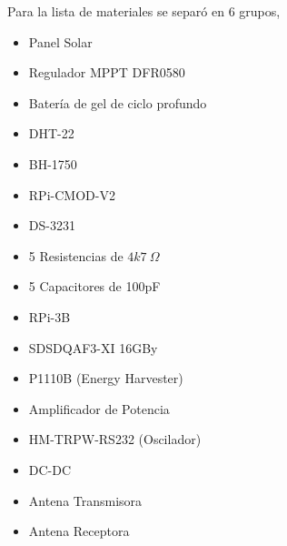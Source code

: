 Para la lista de materiales se separó en 6 grupos, 
\begin{itemize}

\item Panel Solar \TBD
\item Regulador MPPT DFR0580
\item Bater\'ia de gel de ciclo profundo \TBD
\end{itemize}
\begin{itemize}
\item DHT-22 
\item BH-1750
\item RPi-CMOD-V2
\item DS-3231
\item 5 Resistencias de $4k7 \ \Omega$ 
\item 5 Capacitores de 100pF
\end{itemize}
\begin{itemize}
\item RPi-3B
\item SDSDQAF3-XI 16GBy
\end{itemize}
\begin{itemize}

\item P1110B (Energy Harvester)
\item Amplificador de Potencia \TBD
\item HM-TRPW-RS232 (Oscilador)
\item DC-DC \TBD
\item Antena Transmisora \TBD
\item Antena Receptora \TBD

\end{itemize}


